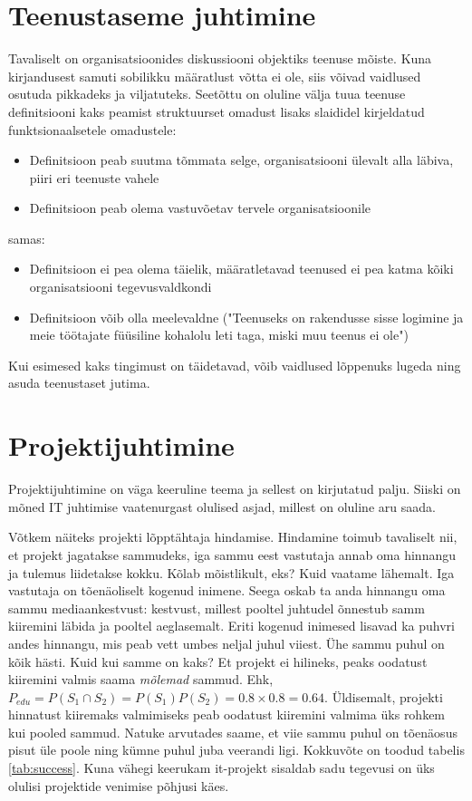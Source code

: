 \section{Teenustaseme juhtimine}
Tavaliselt on organisatsioonides diskussiooni objektiks teenuse mõiste. Kuna kirjandusest samuti sobilikku määratlust võtta ei ole, siis võivad vaidlused osutuda pikkadeks ja viljatuteks. Seetõttu on oluline välja tuua teenuse definitsiooni kaks peamist struktuurset omadust lisaks slaididel kirjeldatud funktsionaalsetele omadustele:
\begin{itemize}
	\item Definitsioon peab suutma tõmmata selge, organisatsiooni ülevalt alla läbiva, piiri eri teenuste vahele
	\item Definitsioon peab olema vastuvõetav tervele organisatsioonile
\end{itemize}

samas:
\begin{itemize}
	\item Definitsioon ei pea olema täielik, määratletavad teenused ei pea katma kõiki organisatsiooni tegevusvaldkondi
	\item Definitsioon võib olla meelevaldne ("Teenuseks on rakendusse sisse logimine ja meie töötajate füüsiline kohalolu leti taga, miski muu teenus ei ole")
\end{itemize}

Kui esimesed kaks tingimust on täidetavad, võib vaidlused lõppenuks lugeda ning asuda teenustaset jutima.

\section{Projektijuhtimine}
Projektijuhtimine on väga keeruline teema ja sellest on kirjutatud palju. Siiski on mõned IT juhtimise vaatenurgast olulised asjad, millest on oluline aru saada. 

Võtkem näiteks projekti lõpptähtaja hindamise. Hindamine toimub tavaliselt nii, et projekt jagatakse sammudeks, iga sammu eest vastutaja annab oma hinnangu ja tulemus liidetakse kokku. Kõlab mõistlikult, eks? Kuid vaatame lähemalt. Iga vastutaja on tõenäoliselt kogenud inimene. Seega oskab ta anda hinnangu oma sammu mediaankestvust: kestvust, millest pooltel juhtudel õnnestub samm kiiremini läbida ja pooltel aeglasemalt. Eriti kogenud inimesed lisavad ka puhvri andes hinnangu, mis peab vett umbes neljal juhul viiest. Ühe sammu puhul on kõik hästi. Kuid kui samme on kaks? Et projekt ei hilineks, peaks oodatust kiiremini valmis saama \emph{mõlemad} sammud. Ehk, $P_{edu}=P(S_1\cap S_2)=P(S_1)P(S_2)=0.8\times0.8=0.64$. Üldisemalt, projekti hinnatust kiiremaks valmimiseks peab oodatust kiiremini valmima üks rohkem kui pooled sammud. Natuke arvutades saame, et viie sammu puhul on tõenäosus pisut üle poole ning kümne puhul juba veerandi ligi. Kokkuvõte on toodud tabelis \ref{tab:success}. Kuna vähegi keerukam it-projekt sisaldab sadu tegevusi on üks olulisi projektide venimise põhjusi käes.

